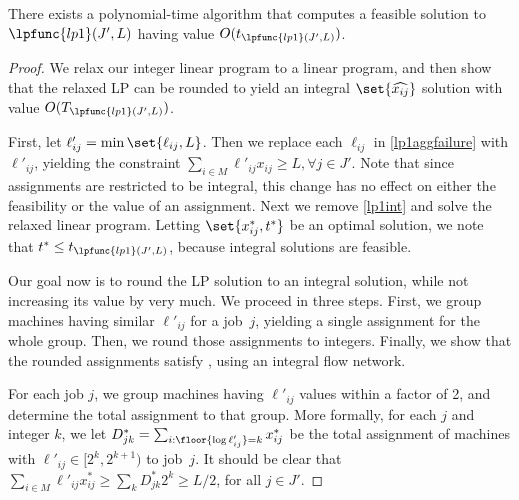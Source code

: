 \begin{lemma}
There exists a polynomial-time algorithm that computes a feasible
  solution to $\lpfunc{lp1}(J',L)$ having value
  $O(t_{\lpfunc{lp1}(J',L)})$.
\end{lemma}
\begin{proof}
  We relax our integer linear program to a linear program, and then
  show that the relaxed LP can be rounded to yield an integral
  $\set{\widehat{x_{ij}}}$ solution with value
  $O(T_{\lpfunc{lp1}(J',L)})$.
  
  First, let $\ell'_{ij} = \min\set{\ell_{ij},L}$.  Then we replace
  each $\ell_{ij}$ in \eqref{lp1aggfailure} with $\ell'_{ij}$,
  yielding the constraint $\sum_{i\in M} \ell'_{ij} x_{ij} \geq L,
  \forall j\in J'$.  Note that since assignments are restricted to be
  integral, this change has no effect on either the feasibility or the
  value of an assignment.  Next we remove \eqref{lp1int} and solve the
  relaxed linear program.  Letting $\set{x^*_{ij}, t^*}$ be an optimal
  solution, we note that $t^* \leq t_{\lpfunc{lp1}(J',L)}$, because
  integral solutions are feasible.
  
  Our goal now is to round the LP solution to an integral solution,
  while not increasing its value by very much.  We 
  proceed in three steps.  First, we group machines having
  similar $\ell'_{ij}$ for a job~$j$, yielding a single assignment for the
  whole group.  Then, we round those assignments to integers.
  Finally, we show that the rounded assignments satisfy
   , using an integral flow network.
  
   For each job $j$, we group machines having $\ell'_{ij}$ values
   within a factor of 2, and determine the total assignment to that
   group.  More formally, for each $j$ and integer $k$, we let
   $D^*_{jk} = \sum_{i:\floor{\log \ell'_{ij}} = k}
   x^*_{ij}$\vspace{-.2em} be the total assignment of machines with
   $\ell'_{ij} \in [2^k,2^{k+1})$ to job~$j$.  It should be clear that $\sum_{i \in M}
   \ell'_{ij} x^*_{ij} \geq \sum_k D^*_{jk} 2^k \geq L/2$, for all
   $j\in J'$.
  

\end{proof}

